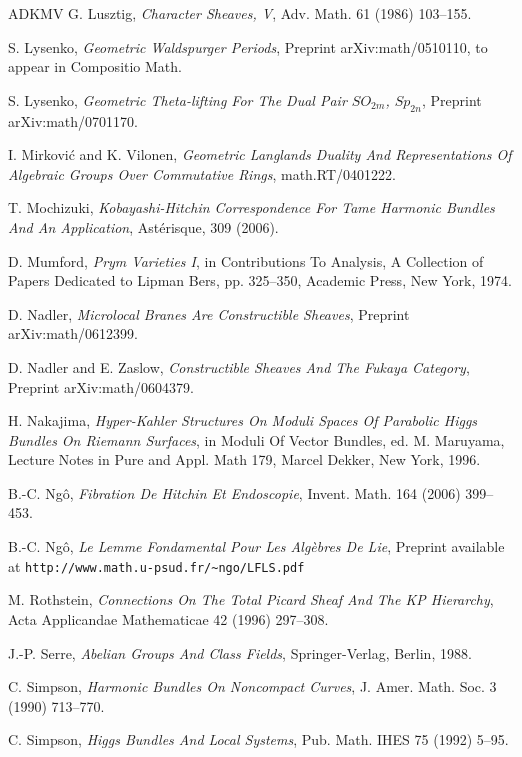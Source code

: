 \begin{thebibliography}{ADKMV}
 G. Lusztig, \emph{Character Sheaves, V}, Adv. Math. 61 (1986) 103--155.

 S. Lysenko, \emph{Geometric Waldspurger Periods}, Preprint arXiv:math/0510110, to appear in Compositio Math.

 S. Lysenko, \emph{Geometric Theta-lifting For The Dual Pair $SO_{2m}$, $Sp_{2n}$}, Preprint arXiv:math/0701170.

 I. Mirkovi\'c and K. Vilonen, \emph{Geometric Langlands Duality And Representations Of Algebraic Groups Over Commutative Rings}, math.RT/0401222.

 T. Mochizuki, \emph{Kobayashi-Hitchin Correspondence For Tame Harmonic Bundles And An Application}, Ast\'erisque, 309 (2006).

 D. Mumford, \emph{Prym Varieties I}, in Contributions To Analysis, A Collection of Papers Dedicated to Lipman Bers, pp. 325--350, Academic Press, New York, 1974.

 D. Nadler, \emph{Microlocal Branes Are Constructible Sheaves}, Preprint arXiv:math/0612399.

 D. Nadler and E. Zaslow, \emph{Constructible Sheaves And The Fukaya Category}, Preprint arXiv:math/0604379.

 H. Nakajima, \emph{Hyper-Kahler Structures On Moduli Spaces Of Parabolic Higgs Bundles On Riemann Surfaces}, in Moduli Of Vector Bundles, ed. M. Maruyama, Lecture Notes in Pure and Appl. Math 179, Marcel Dekker, New York, 1996.

 B.-C. Ng\^o, \emph{Fibration De Hitchin Et Endoscopie}, Invent. Math. 164 (2006) 399--453.

 B.-C. Ng\^o, \emph{Le Lemme Fondamental Pour Les Alg\`ebres De Lie}, Preprint available at \texttt{http://www.math.u-psud.fr/\textasciitilde ngo/LFLS.pdf}

 M. Rothstein, \emph{Connections On The Total Picard Sheaf And The KP Hierarchy}, Acta Applicandae Mathematicae 42 (1996) 297--308.

 J.-P. Serre, \emph{Abelian Groups And Class Fields}, Springer-Verlag, Berlin, 1988.

 C. Simpson, \emph{Harmonic Bundles On Noncompact Curves}, J. Amer. Math. Soc. 3 (1990) 713--770.

 C. Simpson, \emph{Higgs Bundles And Local Systems}, Pub. Math. IHES 75 (1992) 5--95.


\end{thebibliography}
